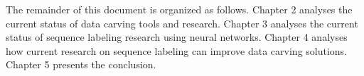 
The remainder of this document is organized as follows.
    Chapter 2 analyses the current status of data carving tools and research. 
    Chapter 3 analyses the current status of sequence labeling research using neural networks.
    Chapter 4 analyses how current research on sequence labeling can improve data carving solutions.
    Chapter 5 presents the conclusion.
